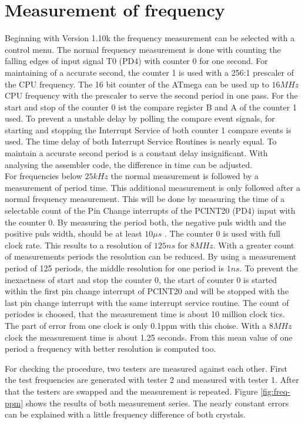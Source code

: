 
\section{Measurement of frequency}
\label{sec:frequency}

Beginning with Version 1.10k the frequency measurement can be selected with a control menu.
The normal frequency measurement is done with counting the falling edges of input signal T0 (PD4)
with counter 0 for one second. For maintaining of a accurate second, the counter 1 is used
with a 256:1 prescaler of the CPU frequency. 
The 16 bit counter of the ATmega can be used up to \(16MHz\) CPU frequency with the prescaler to
serve the second period in one pass.
For the start and stop of the counter 0 ist the compare register B and A of the counter 1 used.
To prevent a unstable delay by polling the compare event signals, for starting and stopping the
Interrupt Service of both counter 1 compare events is used.
The time delay of both Interrupt Service Routines is nearly equal.
To maintain a accurate second period is a constant delay insignificant.
With analysing the assembler code, the difference in time can be adjusted.\\

For frequencies below \(25kHz\) the normal measurement is followed by a measurement of
period time. This additional measurement is only followed after a normal frequency measurement.
This will be done by measuring the time of a selectable count of the Pin Change interrupts
of the PCINT20 (PD4) input with the counter 0.
By measuring the period both, the negative puls width and the positive puls width, should be
at least \(10\mu s\) .
The counter 0 is used with full clock rate. This results to a resolution of \(125ns\) for
\(8MHz\). With a greater count of measurements periods the resolution can be reduced.
By using a measurement period of 125 periods, the middle resolution for one period is \(1ns\).
To prevent the inexactness of start and stop the counter 0, the start of counter 0 is started
within the first pin change interrupt of PCINT20 and will be stopped with the last pin change interrupt
with the same interrupt service routine.
The count of periodes is choosed, that the measurement time is about 10 million clock tics.
The part of error from one clock is only 0.1ppm with this choise.
With a \(8MHz\) clock the measurement time is about 1.25 seconds.
From this mean value of one period a frequency with better resolution is computed too.

For checking the procedure, two testers are measured against each other.
First the test frequencies are generated with tester 2 and measured with tester 1.
After that the testers are swapped and the measurement is repeated.
Figure \ref{fig:freq-ppm} shows the results of both measurement series.
The nearly constant errors can be explained with a little frequency difference of both crystals.

